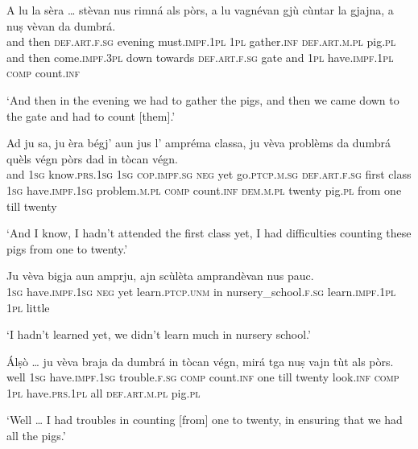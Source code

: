 \begin{linenumbers}
	\gll    A lu la sèra … stèvan nus rimná als pòrs, a lu vagnévan gjù cùntar la gjajna, a nuṣ vèvan da dumbrá. \\
	and then \textsc{def.art.f.sg} evening {}  must.\textsc{impf.1pl} \textsc{1pl} gather.\textsc{inf} \textsc{def.art.m.pl} pig.\textsc{pl} and then come.\textsc{impf.3pl} down towards \textsc{def.art.f.sg} gate and \textsc{1pl} have.\textsc{impf.1pl}  \textsc{comp} count.\textsc{inf}\\
\end{linenumbers}
\medskip
\glt `And then in the evening we had to gather the pigs, and then we came down to the gate and had to count [them].'
\medskip

\begin{linenumbers}
	\gll    Ad ju sa, ju èra bégj’ aun jus l’ ampréma classa, ju vèva problèms da dumbrá quèls végn pòrs dad in tòcan végn.\\
	and  \textsc{1sg} know.\textsc{prs.1sg} \textsc{1sg} \textsc{cop.impf.sg} \textsc{neg} yet go.\textsc{ptcp.m.sg} \textsc{def.art.f.sg} first class \textsc{1sg} have.\textsc{impf.1sg} problem.\textsc{m.pl} \textsc{comp} count.\textsc{inf} \textsc{dem.m.pl} twenty pig.\textsc{pl} from one till twenty\\
\end{linenumbers}
\medskip
\glt `And I know, I hadn’t attended the first class yet, I had difficulties counting these pigs from one to twenty.'
\medskip

\begin{linenumbers}
\gll  Ju vèva bigja aun amprju, ajn scùlèta amprandèvan nus pauc.\\
\textsc{1sg} have.\textsc{impf.1sg} \textsc{neg} yet  learn.\textsc{ptcp.unm} in  nursery\_school.\textsc{f.sg} learn.\textsc{impf.1pl}  \textsc{1pl} little \\
\end{linenumbers}
\medskip
\glt `I hadn’t learned yet, we didn’t learn much in nursery school.'
\medskip

\begin{linenumbers}
	\gll    Álṣò … ju vèva braja da dumbrá in tòcan végn, mirá tga nuṣ vajn tùt als pòrs.\\
	well {} \textsc{1sg}  have.\textsc{impf.1sg} trouble.\textsc{f.sg}  \textsc{comp} count.\textsc{inf} one till twenty  look.\textsc{inf} \textsc{comp} \textsc{1pl} have.\textsc{prs.1pl} all \textsc{def.art.m.pl} pig.\textsc{pl}\\
\end{linenumbers}
\medskip
\glt `Well … I had troubles in counting [from] one to twenty, in ensuring that we had all the pigs.'
\medskip

